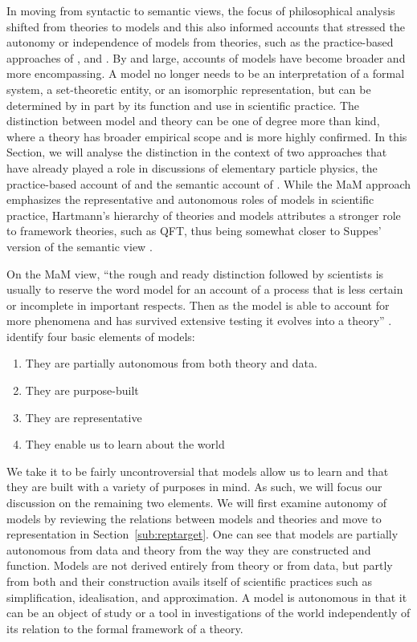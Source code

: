 In moving from syntactic to semantic views, the focus of philosophical analysis shifted from theories to models and this also informed accounts that stressed the autonomy or independence of models from theories, such as the practice-based approaches of \citet{cartwright99}, and \citet{morganmorrison}.
By and large, accounts of models have become broader and more encompassing.
A model no longer needs to be an interpretation of a formal system, a set-theoretic entity, or an isomorphic representation, but can be determined by in part by its function and use in scientific practice.
The distinction between model and theory can be one of degree more than kind, where a theory has broader empirical scope and is more highly confirmed. 
In this Section, we will analyse the distinction in the context of two approaches that have already played a role in discussions of elementary particle physics, the practice-based account of \citet{morganmorrison} and the semantic account of \citet{hartmann1998}. 
While the MaM approach emphasizes the representative and autonomous roles of models in scientific practice, Hartmann's  hierarchy of theories and models attributes a stronger role to framework theories, such as QFT, thus being somewhat closer to Suppes' version of the semantic view \citep{suppes1962}. 


On the MaM view, ``the rough and ready distinction followed by scientists is usually to reserve the word model for an account of a process that is less certain or incomplete in important respects. 
Then as the model is able to account for more phenomena and has survived extensive testing it evolves into a theory'' \citep[p.~18]{morganmorrison}. 
\citeauthor{morganmorrison} identify four basic elements of models: 
\begin{enumerate}
	\item They are partially autonomous from both theory and data.
	\item They are purpose-built
	\item They are representative
	\item They enable us to learn about the world
\end{enumerate}
We take it to be fairly uncontroversial that models allow us to learn and that they are built with a variety of purposes in mind.
As such, we will focus our discussion on the remaining two elements.
We will first examine autonomy of models by reviewing the relations between models and theories and move to representation in Section~\ref{sub:reptarget}.
One can see that models are partially autonomous from data and theory from the way they are constructed and function.
Models are not derived entirely from theory or from data, but partly from both and their construction avails itself of scientific practices such as simplification, idealisation, and approximation.
A model is autonomous in that it can be an object of study or a tool in investigations of the world independently of its relation to the formal framework of a theory.

